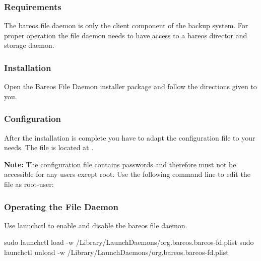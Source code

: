 \subsubsection{Requirements}

The bareos file daemon is only the client component of the backup system. For proper operation the file daemon needs to have access to a bareos director and storage daemon.

\subsubsection{Installation}

Open the Bareos File Daemon installer package and follow the directions given to you.

\subsubsection{Configuration}

After the installation is complete you have to adapt the configuration file to your needs. The file is located at .

\textbf{Note:} The configuration file contains passwords and therefore must not be accessible for any users except root. Use the following command line to edit the file as root-user: 

\subsubsection{Operating the File Daemon}

Use launchctl to enable and disable the bareos file daemon.

\begin{commands}{}
sudo launchctl load -w /Library/LaunchDaemons/org.bareos.bareos-fd.plist
sudo launchctl unload -w /Library/LaunchDaemons/org.bareos.bareos-fd.plist
\end{commands}